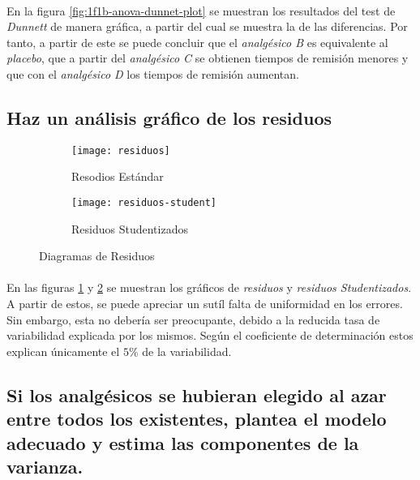 \documentclass[11pt]{article}
\begin{document}
      \paragraph{}
      En la figura \ref{fig:1f1b-anova-dunnet-plot} se muestran los resultados del test de \emph{Dunnett} de manera gráfica, a partir del cual se muestra la  de las diferencias. Por tanto, a partir de este se puede concluir que el \emph{analgésico B} es equivalente al \emph{placebo}, que a partir del \emph{analgésico C} se obtienen tiempos de remisión menores y que con el \emph{analgésico D} los tiempos de remisión aumentan.

    \subsection{Haz un análisis gráfico de los residuos}

      \begin{figure}[!h]
        \centering
        \begin{subfigure}{.5\textwidth}
          \centering
          \texttt{[image: residuos]}
          \caption{Resodios Estándar}
          \label{fig:residuos-standard}
        \end{subfigure}%
        \begin{subfigure}{.5\textwidth}
          \centering
          \texttt{[image: residuos-student]}
          \caption{Residuos Studentizados}
          \label{fig:residuos-student}
        \end{subfigure}
        \caption{Diagramas de Residuos}
        \label{fig:residuos}
      \end{figure}

      \paragraph{}
      En las figuras \ref{fig:residuos-standard} y \ref{fig:residuos-student} se muestran los gráficos de \emph{residuos} y \emph{residuos Studentizados}. A partir de estos, se puede apreciar un sutíl falta de uniformidad en los errores. Sin embargo, esta no debería ser preocupante, debido a la reducida tasa de variabilidad explicada por los mismos. Según el coeficiente de determinación estos explican únicamente el $5\%$ de la variabilidad.

    \subsection{Si los analgésicos se hubieran elegido al azar entre todos los existentes, plantea el modelo adecuado y estima las componentes de la varianza.}
\end{document}
